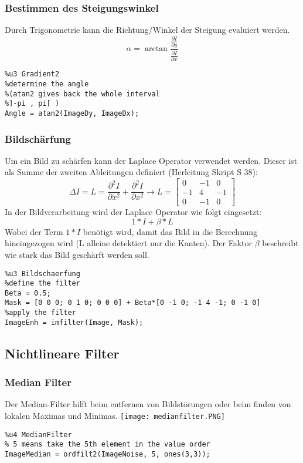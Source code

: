 \subsubsection{Bestimmen des Steigungswinkel}
Durch Trigonometrie kann die Richtung/Winkel der Steigung evaluiert werden.
\begin{equation}
\alpha = \arctan{\frac{\frac{\partial I}{\partial y}}{\frac{\partial I}{\partial x}}}
\end{equation}
\begin{lstlisting}
%u3 Gradient2
%determine the angle
%(atan2 gives back the whole interval
%]-pi , pi[ )
Angle = atan2(ImageDy, ImageDx);
\end{lstlisting}
\subsubsection{Bildschärfung}
Um ein Bild zu schärfen kann der Laplace Operator verwendet werden. Dieser ist als Summe der zweiten Ableitungen definiert (Herleitung Skript S 38):
\begin{equation}
\Delta I = L = \frac{\partial ^2I}{\partial x^2} + \frac{\partial ^2I}{\partial x^2} \to L = \begin{bmatrix}
0 & -1 & 0 \\
-1 & 4 & -1 \\
0 & -1 & 0
\end{bmatrix}
\end{equation}
In der Bildverarbeitung wird der Laplace Operator wie folgt eingesetzt:
\begin{equation}
1*I+\beta * L
\end{equation}
Wobei der Term $1*I$ benötigt wird, damit das Bild in die Berechnung hineingezogen wird (L alleine detektiert nur die Kanten). Der Faktor $\beta$ beschreibt wie stark das Bild geschärft werden soll.
\begin{lstlisting}
%u3 Bildschaerfung
%define the filter
Beta = 0.5;
Mask = [0 0 0; 0 1 0; 0 0 0] + Beta*[0 -1 0; -1 4 -1; 0 -1 0]
%apply the filter
ImageEnh = imfilter(Image, Mask);
\end{lstlisting}

\subsection{Nichtlineare Filter}
\subsubsection{Median Filter}
Der Median-Filter hilft beim entfernen von Bildstörungen oder beim finden von lokalen Maximas und Minimas.
\texttt{[image: medianfilter.PNG]}
\begin{lstlisting}
%u4 MedianFilter
% 5 means take the 5th element in the value order
ImageMedian = ordfilt2(ImageNoise, 5, ones(3,3));
\end{lstlisting}
